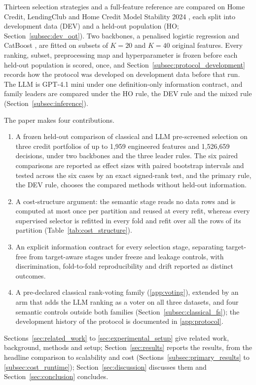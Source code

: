 \documentclass[final,5p,twocolumn]{elsarticle}
\newcommand{\Kfeat}{K}
\begin{document}
Thirteen selection strategies and a full-feature reference are compared on Home Credit, LendingClub and Home Credit Model Stability 2024 \cite{homecredit2018,lendingclub_kaggle,homecredit2024}, each split into development data (DEV) and a held-out population (HO; Section~\ref{subsec:dev_oot}). Two backbones, a penalised logistic regression and CatBoost \cite{prokhorenkova2018}, are fitted on subsets of $\Kfeat=20$ and $\Kfeat=40$ original features. Every ranking, subset, preprocessing map and hyperparameter is frozen before each held-out population is scored, once, and Section~\ref{subsec:protocol_development} records how the protocol was developed on development data before that run. The LLM is GPT-4.1 mini \cite{openai2025gpt41} under one definition-only information contract, and family leaders are compared under the HO rule, the DEV rule and the mixed rule (Section~\ref{subsec:inference}).

The paper makes four contributions.
\begin{enumerate}
    \item A frozen held-out comparison of classical and LLM pre-screened selection on three credit portfolios of up to 1,959 engineered features and 1,526,659 decisions, under two backbones and the three leader rules. The six paired comparisons are reported as effect sizes with paired bootstrap intervals and tested across the six cases by an exact signed-rank test, and the primary rule, the DEV rule, chooses the compared methods without held-out information.
    \item A cost-structure argument: the semantic stage reads no data rows and is computed at most once per partition and reused at every refit, whereas every supervised selector is refitted in every fold and refit over all the rows of its partition (Table~\ref{tab:cost_structure}).
    \item An explicit information contract for every selection stage, separating target-free from target-aware stages under freeze and leakage controls, with discrimination, fold-to-fold reproducibility and drift reported as distinct outcomes.
    \item A pre-declared classical rank-voting family (\ref{app:voting}), extended by an arm that adds the LLM ranking as a voter on all three datasets, and four semantic controls outside both families (Section~\ref{subsec:classical_fs}); the development history of the protocol is documented in \ref{app:protocol}.
\end{enumerate}
Sections~\ref{sec:related_work} to \ref{sec:experimental_setup} give related work, background, methods and setup; Section~\ref{sec:results} reports the results, from the headline comparison to scalability and cost (Sections~\ref{subsec:primary_results} to \ref{subsec:cost_runtime}); Section~\ref{sec:discussion} discusses them and Section~\ref{sec:conclusion} concludes.
\end{document}
